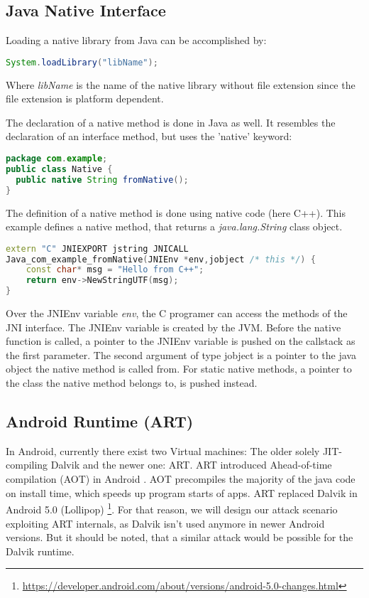 \subsection{Java Native Interface}

Loading a native library from Java can be accomplished by:
\begin{lstlisting}[language=Java, style=JavaCodeStyle]
 System.loadLibrary("libName");
\end{lstlisting}
Where \emph{libName} is the name of the native library without file extension since the file extension is platform dependent.

The declaration of a native method is done in Java as well. It resembles the declaration of an interface method, but uses the 'native' keyword:
\begin{lstlisting}[language=Java, style=JavaCodeStyle]
package com.example;
public class Native {
  public native String fromNative();
}
\end{lstlisting}

The definition of  a native method is done using native code (here C++). This example defines a native method, that returns a \emph{java.lang.String} class object.
\begin{lstlisting}[language=C++, style=CppCodeStyle]
extern "C" JNIEXPORT jstring JNICALL
Java_com_example_fromNative(JNIEnv *env,jobject /* this */) {
    const char* msg = "Hello from C++";
    return env->NewStringUTF(msg);
}
\end{lstlisting}

Over the JNIEnv variable \emph{env}, the C programer can access the methods of the JNI interface. The JNIEnv variable is created by the JVM. Before the native function is called, a pointer to the JNIEnv variable is pushed on the callstack as the first parameter. The second argument of type jobject is a pointer to the java object the native method is called from. For static native methods, a pointer to the class the native method belongs to, is pushed instead. 

\subsection{Android Runtime (ART)}
In Android, currently there exist two Virtual machines: The older solely JIT-compiling Dalvik and the newer one: ART. ART introduced Ahead-of-time compilation (AOT) in Android \cite{ArtAndDalvik}. AOT precompiles the majority of the java code on install time, which speeds up program starts of apps. ART replaced Dalvik in Android 5.0 (Lollipop) \footnote{\url{https://developer.android.com/about/versions/android-5.0-changes.html}}. For that reason, we will design our attack scenario exploiting ART internals, as Dalvik isn't used anymore in newer Android versions. But it should be noted, that a similar attack would be possible for the Dalvik runtime.

